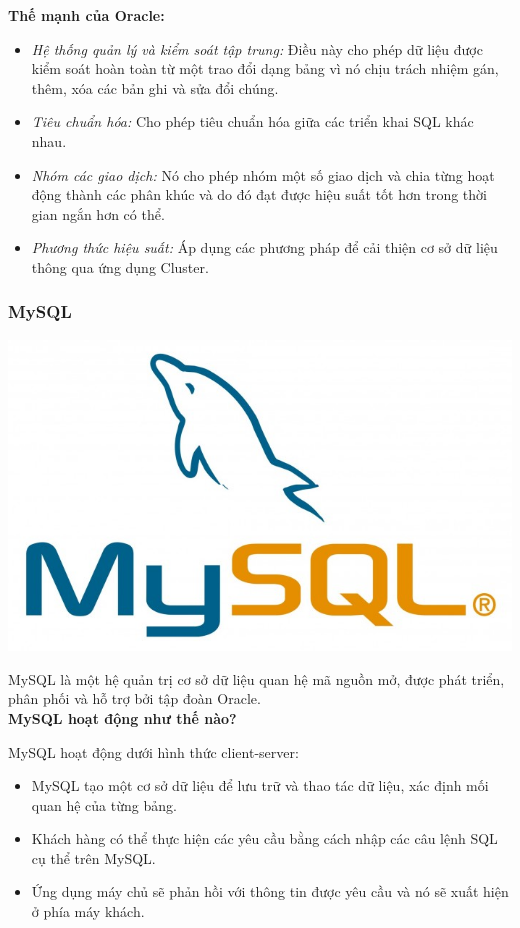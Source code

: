 \textbf{Thế mạnh của Oracle:}
\begin{itemize}
    \item \textit{Hệ thống quản lý và kiểm soát tập trung:} Điều này cho phép dữ liệu được kiểm soát hoàn toàn từ một trao đổi dạng bảng vì nó chịu trách nhiệm gán, thêm, xóa các bản ghi và sửa đổi chúng.
    \item \textit{Tiêu chuẩn hóa:} Cho phép tiêu chuẩn hóa giữa các triển khai SQL khác nhau.
    \item \textit{Nhóm các giao dịch:} Nó cho phép nhóm một số giao dịch và chia từng hoạt động thành các phân khúc và do đó đạt được hiệu suất tốt hơn trong thời gian ngắn hơn có thể.
    \item \textit{Phương thức hiệu suất:} Áp dụng các phương pháp để cải thiện cơ sở dữ liệu thông qua ứng dụng Cluster.
\end{itemize}
\subsubsection{MySQL}
\begin{center}
  \captionsetup{type=figure}
    \includegraphics[scale=0.5]{image/mysql.jpg}
\end{center}

MySQL là một hệ quản trị cơ sở dữ liệu quan hệ mã nguồn mở, được phát triển, phân phối và hỗ trợ bởi tập đoàn Oracle.\\

\textbf{MySQL hoạt động như thế nào?}

MySQL hoạt động dưới hình thức client-server:
\begin{itemize}
    \item MySQL tạo một cơ sở dữ liệu để lưu trữ và thao tác dữ liệu, xác định mối quan hệ của từng bảng.
    \item Khách hàng có thể thực hiện các yêu cầu bằng cách nhập các câu lệnh SQL cụ thể trên MySQL.
    \item Ứng dụng máy chủ sẽ phản hồi với thông tin được yêu cầu và nó sẽ xuất hiện ở phía máy khách.
\end{itemize}


